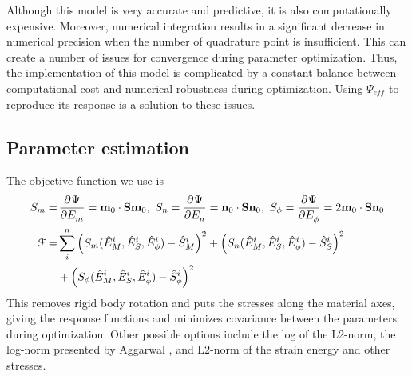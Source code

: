     Although this model is very accurate and predictive, it is also computationally expensive. Moreover, numerical integration results in a significant decrease in numerical precision when the number of quadrature point is insufficient. This can create a number of issues for convergence during parameter optimization. Thus, the implementation of this model is complicated by a constant balance between computational cost and numerical robustness during optimization. Using $\Psi_{eff}$ to reproduce its response is a solution to these issues. %
    
    
    



    









\subsection{Parameter estimation}

    The objective function we use is 
\begin{equation}\label{eqn:objectivefunction}
\begin{aligned}
S_m =& \dpd{\Psi}{E_m} = \mathbf{m}_0\cdot\mathbf{S}\mathbf{m}_0,
    \  S_n = \dpd{\Psi}{E_n} = \mathbf{n}_0\cdot\mathbf{S}\mathbf{n}_0, 
    \  S_\phi = \dpd{\Psi}{E_\phi} = 2\mathbf{m}_0\cdot\mathbf{S}\mathbf{n}_0 \\
\mathcal{F} =& \sum_i^n \left(S_m(\hat{E}_M^i, \hat{E}_S^i, \hat{E}_\phi^i) - \hat{S}_M^i \right)^2 + \left(S_n(\hat{E}_M^i, \hat{E}_S^i, \hat{E}_\phi^i) - \hat{S}_S^i \right)^2     \\
    &+ \left(S_\phi(\hat{E}_M^i, \hat{E}_S^i, \hat{E}_\phi^i) - \hat{S}_\phi^i \right)^2
\end{aligned}
\end{equation}
    This removes rigid body rotation and puts the stresses along the material axes, giving the response functions and minimizes covariance between the parameters during optimization. Other possible options include the log of the L2-norm, the log-norm presented by Aggarwal \cite{aggarwal_improved_2017}, and L2-norm of the strain energy and other stresses.


